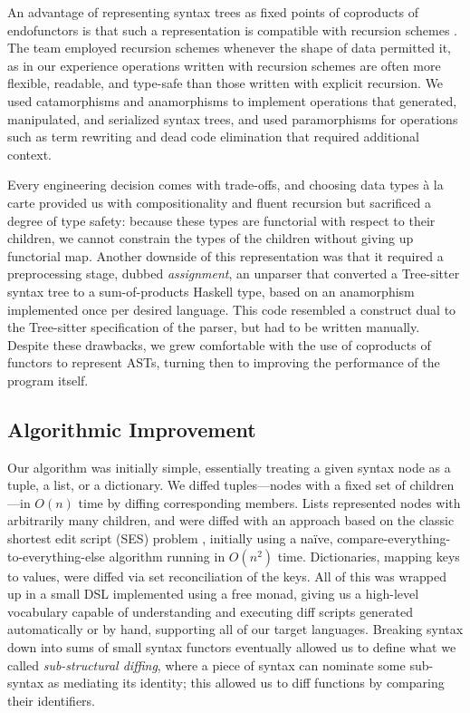 \documentclass[acmsmall,fleqn]{acmart}
\begin{document}
An advantage of representing syntax trees as fixed points of coproducts of
endofunctors is that such a representation is compatible with recursion schemes
\cite{Meijer91Bananas}. The team employed recursion schemes whenever the shape
of data permitted it, as in our experience operations written with recursion schemes
are often more flexible, readable, and type-safe than those written with
explicit recursion. We used catamorphisms and anamorphisms to implement
operations that generated, manipulated, and serialized syntax trees, and used
paramorphisms for operations such as term rewriting and dead code elimination
that required additional context.

Every engineering decision comes with trade-offs, and choosing data types à
la carte provided us with compositionality and fluent recursion but
sacrificed a degree of type safety: because these types are functorial with
respect to their children, we cannot constrain the types of the children
without giving up functorial map. Another downside of this representation
was that it required a preprocessing stage, dubbed \emph{assignment}, an
unparser that converted a Tree-sitter syntax tree to a sum-of-products
Haskell type, based on an anamorphism implemented once per desired language.
This code resembled a construct dual to the Tree-sitter specification of the
parser, but had to be written manually. Despite these drawbacks, we grew
comfortable with the use of coproducts of functors to represent ASTs,
turning then to improving the performance of the program itself.

\subsection{Algorithmic Improvement}

Our algorithm was initially simple, essentially treating a given syntax node as
a tuple, a list, or a dictionary. We diffed tuples—nodes with a fixed set of
children—in $O(n)$ time by diffing corresponding members. Lists represented
nodes with arbitrarily many children, and were diffed with an approach based on
the classic shortest edit script (SES) problem \cite{Myers86Diff}, initially
using a naïve, compare-everything-to-everything-else algorithm running in
$O(n^2)$ time. Dictionaries, mapping keys to values, were diffed via set
reconciliation of the keys. All of this was wrapped up in a small DSL
implemented using a free monad, giving us a high-level vocabulary capable of
understanding and executing diff scripts generated automatically or by hand,
supporting all of our target languages. Breaking syntax down into sums of small
syntax functors eventually allowed us to define what we called
\emph{sub-structural diffing}, where a piece of syntax can nominate some
sub-syntax as mediating its identity; this allowed us to diff functions by
comparing their identifiers.
\end{document}
